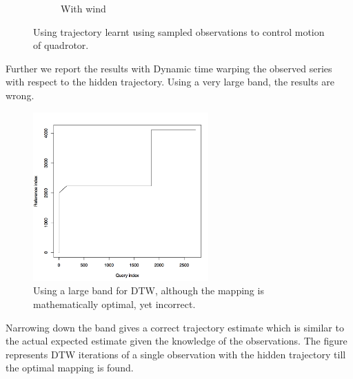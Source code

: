 \documentclass[hidelinks,BTech]{iitmdiss}
\begin{document}
\begin{figure}[H]
\begin{subfigure}[t]{0.48\textwidth}
      \caption{With wind}
  \end{subfigure}
  \caption{Using trajectory learnt using sampled observations to control motion of quadrotor.}
\end{figure}
Further we report the results with Dynamic time warping the observed series with respect to the hidden trajectory. Using a very large band, the results are wrong.
\begin{figure}[H]
  \centering
    \includegraphics[width=0.6\textwidth]{DTW_no_band.png}
    \caption{Using a large band for DTW, although the mapping is mathematically optimal, yet incorrect.}
\end{figure}	
Narrowing down the band gives a correct trajectory estimate which is similar to the actual expected estimate given the knowledge of the observations. The figure represents DTW iterations of a single observation with the hidden trajectory till the optimal mapping is found.
\end{document}
